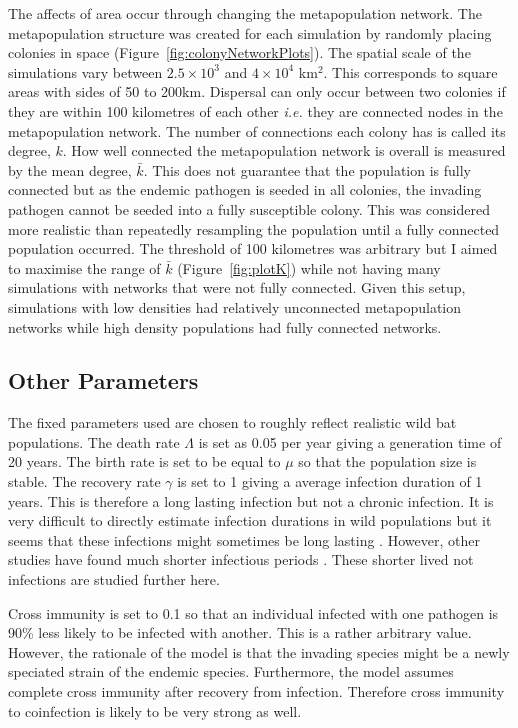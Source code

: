 The affects of area occur through changing the metapopulation network.
The metapopulation structure was created for each simulation by randomly placing colonies in space (Figure~\ref{fig:colonyNetworkPlots}).
The spatial scale of the simulations vary between \ensuremath{2.5\times 10^{3}} and \ensuremath{4\times 10^{4}} km$^2$.
This corresponds to square areas with sides of 50 to 200km.
Dispersal can only occur between two colonies if they are within 100 kilometres of each other \emph{i.e.} they are connected nodes in the metapopulation network.
The number of connections each colony has is called its degree, $k$.
How well connected the metapopulation network is overall is measured by the mean degree, $\bar{k}$.
This does not guarantee that the population is fully connected but as the endemic pathogen is seeded in all colonies, the invading pathogen cannot be seeded into a fully susceptible colony.
This was considered more realistic than repeatedly resampling the population until a fully connected population occurred.
The threshold of 100 kilometres was arbitrary but I aimed to maximise the range  of $\bar{k}$ (Figure~\ref{fig:plotK}) while not having many simulations with networks that were not fully connected.
Given this setup, simulations with low densities had relatively unconnected metapopulation networks while high density populations had fully connected networks.



\subsection{Other Parameters}


The fixed parameters used are chosen to roughly reflect realistic wild bat populations. 
The death rate $\Lambda$ is set as 0.05 per year giving a generation time of 20 years.
The birth rate is set to be equal to $\mu$ so that the population size is stable.
The recovery rate $\gamma$ is set to 1 giving a average infection duration of 1 years. 
This is therefore a long lasting infection but not a chronic infection. 
It is very difficult to directly estimate infection durations in wild populations but it seems that these infections might sometimes be long lasting \cite{peel2012henipavirus, plowright2015ecological}.
However, other studies have found much shorter infectious periods \cite{amengual2007temporal}.
These shorter lived not infections are studied further here.

Cross immunity is set to 0.1 so that an individual infected with one pathogen is 90\% less likely to be infected with another.
This is a rather arbitrary value.
However, the rationale of the model is that the invading species might be a newly speciated strain of the endemic species.
Furthermore, the model assumes complete cross immunity after recovery from infection.
Therefore cross immunity to coinfection is likely to be very strong as well.

